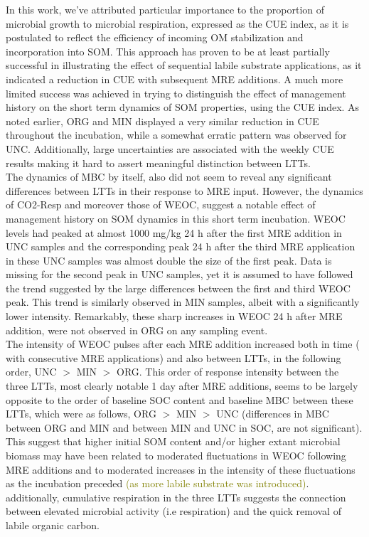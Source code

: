 \documentclass[12pt]{report}
\newcommand{\myGreen}[1]{\textcolor{olive}{#1}} %
\begin{document}
In this work, we’ve attributed particular importance to the proportion of microbial growth to microbial respiration, expressed as the CUE index, as it is postulated to reflect the efficiency of incoming OM stabilization and incorporation into SOM. This approach has proven to be at least partially successful in illustrating the effect of sequential labile substrate applications, as it indicated a reduction in CUE with subsequent MRE additions. A much more limited success was achieved in trying to distinguish the effect of management history on the short term dynamics of SOM properties, using  the CUE index. As noted earlier, ORG and MIN displayed a very similar  reduction in CUE throughout the incubation, while a somewhat erratic pattern was observed for UNC. Additionally, large uncertainties are associated with the weekly CUE results making it hard to assert  meaningful distinction between LTTs.\\
The dynamics of MBC by itself, also did not seem to reveal any significant differences between LTTs in their response to MRE input.
However, the dynamics of CO2-Resp and moreover those of WEOC, suggest a notable effect of management history on SOM dynamics in this short term incubation. WEOC levels had peaked at almost 1000 mg/kg  24 h after the first MRE addition in UNC samples and the corresponding peak 24 h after the third MRE application in these UNC samples was almost double the size of the first peak. Data is missing for the second peak in UNC samples, yet it is assumed to have followed the trend suggested by the large differences between the first and third WEOC peak. This trend is similarly observed in MIN samples, albeit with a significantly lower intensity. Remarkably, these sharp increases in WEOC 24 h after MRE addition, were not observed in ORG on any sampling event.\\
The intensity of WEOC pulses after each MRE addition increased both in time ( with consecutive MRE applications) and also between LTTs, in the following order, UNC $ > $ MIN $ > $ ORG. This order of response intensity between the three LTTs, most clearly notable 1 day after MRE additions, seems to be largely opposite to the order of baseline SOC content and baseline MBC between these LTTs, which were as follows, ORG $ > $ MIN $ > $ UNC (differences in MBC between ORG and MIN and between MIN and UNC in SOC, are not significant). This suggest  that higher initial SOM content and/or higher extant microbial biomass may have been related to moderated fluctuations in WEOC following MRE additions and to moderated increases in the intensity of these fluctuations as the incubation preceded \myGreen{(as more labile substrate was introduced)}. additionally, cumulative respiration in the three LTTs suggests the connection between elevated microbial activity (i.e respiration) and the quick removal of labile organic carbon.\\
\end{document}
